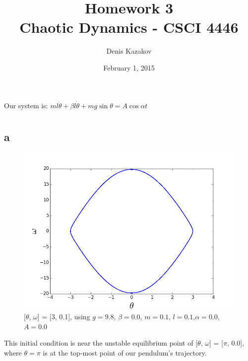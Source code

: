 \documentclass[12pt]{article}\pagestyle{myheadings}
\title{Homework 3 \\ Chaotic Dynamics - CSCI 4446}
\author{Denis Kazakov}
\date{February 1, 2015}
\theoremstyle{plain}
\begin{document}
\maketitle


\section{}

Our system is:	
$ml \ddot{\theta} + \beta l \dot{\theta} + mg\sin{\theta} = A \cos{\alpha t}$

\section{}

\subsection{a}	
\begin{figure}[H]
\centering
\includegraphics[scale=.25]{2a}
\caption{[$\theta$, $\omega$] = [3, 0.1], using $g = 9.8$, $\beta = 0.0$, $m = 0.1$, $l = 0.1$,$\alpha = 0.0$, $A = 0.0$}
\label{fig:my_label}
\end{figure}

This initial condition is near the unstable equilibrium point of [$\theta$, $\omega$] = [$\pi$, 0.0], where $\theta = \pi$ is at the top-most point of our pendulum's trajectory. 
\end{document}
